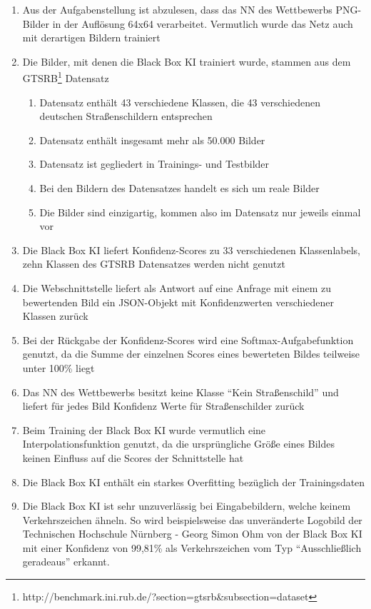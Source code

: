 \begin{enumerate}
	\item Aus der Aufgabenstellung ist abzulesen, dass das \ac{NN} des Wettbewerbs PNG-Bilder in der Auflösung 64x64 verarbeitet. Vermutlich wurde das Netz auch mit derartigen Bildern trainiert
	\item Die Bilder, mit denen die Black Box \ac{KI} trainiert wurde, stammen aus dem GTSRB\footnote{http://benchmark.ini.rub.de/?section=gtsrb\&subsection=dataset} Datensatz
	\begin{enumerate}
		\item Datensatz enthält 43 verschiedene Klassen, die 43 verschiedenen deutschen Straßenschildern entsprechen
		\item Datensatz enthält insgesamt mehr als 50.000 Bilder
		\item Datensatz ist gegliedert in Trainings- und Testbilder
		\item Bei den Bildern des Datensatzes handelt es sich um reale Bilder
		\item Die Bilder sind einzigartig, kommen also im Datensatz nur jeweils einmal vor
	\end{enumerate}
	\item Die Black Box \ac{KI} liefert Konfidenz-Scores zu 33 verschiedenen Klassenlabels, zehn Klassen des \ac{GTSRB} Datensatzes werden nicht genutzt
	\item Die Webschnittstelle liefert als Antwort auf eine Anfrage mit einem zu bewertenden Bild ein JSON-Objekt mit Konfidenzwerten verschiedener Klassen zurück
	\item Bei der Rückgabe der Konfidenz-Scores wird eine Softmax-Aufgabefunktion genutzt, da die Summe der einzelnen Scores eines bewerteten Bildes teilweise unter 100\% liegt
	\item Das \ac{NN} des Wettbewerbs besitzt keine Klasse "`Kein Straßenschild"' und liefert für jedes Bild Konfidenz Werte für Straßenschilder zurück
	\item Beim Training der Black Box \ac{KI} wurde vermutlich eine Interpolationsfunktion genutzt, da die ursprüngliche Größe eines Bildes keinen Einfluss auf die Scores der Schnittstelle hat  
	\item Die Black Box \ac{KI} enthält ein starkes Overfitting bezüglich der Trainingsdaten
	\item Die Black Box \ac{KI} ist sehr unzuverlässig bei Eingabebildern, welche keinem Verkehrszeichen ähneln. So wird beispielsweise das unveränderte Logobild der Technischen Hochschule Nürnberg - Georg Simon Ohm von der Black Box \ac{KI} mit einer Konfidenz von 99,81\% als Verkehrszeichen vom Typ "`Ausschließlich geradeaus"' erkannt.
\end{enumerate}


